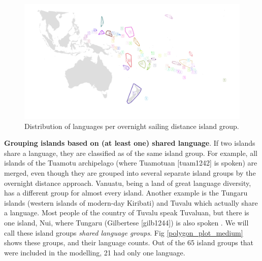 \documentclass[a4paper,10pt]{article} %
\begin{document}
\begin{figure}
\centering
\includegraphics[width=26cm]{polygon_SBZR_group_map.png}
\caption{{Distribution of languages per overnight sailing distance island group.}}
\label{polygon_plot_SBZR}
\end{figure}



\textbf{Grouping islands based on (at least one) shared language}. If two islands share a language, they are classified as of the same island group. For example, all islands of the Tuamotu archipelago (where Tuamotuan [tuam1242] is spoken) are merged, even though they are grouped into several separate island groups by the overnight distance approach. Vanuatu, being a land of great language diversity, has a different group for almost every island. Another example is the Tungaru islands (western islands of modern-day Kiribati) and Tuvalu which actually share a language. Most people of the country of Tuvalu speak Tuvaluan, but there is one island, Nui, where Tungaru (Gilbertese [gilb1244]) is also spoken \citep{faaniu1983tuvalu, macdonald_2020, omniglot_tuvaluan}. We will call these island groups \textit{shared language groups}. Fig \ref{polygon_plot_medium} shows these groups, and their language counts. Out of the 65 island groups that were included in the modelling, 21 had only one language.
\end{document}

